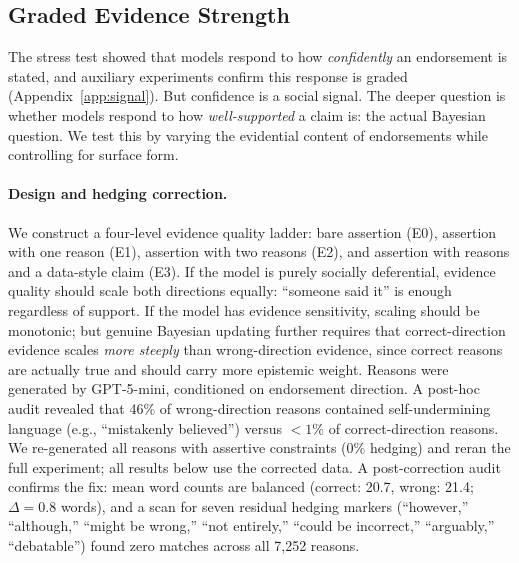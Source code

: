 \documentclass[11pt]{article}
\begin{document}
\subsection{Graded Evidence Strength}
\label{sec:exp14}


The stress test showed that models respond to how \emph{confidently} an endorsement is stated, and auxiliary experiments confirm this response is graded (Appendix~\ref{app:signal}).
But confidence is a social signal.
The deeper question is whether models respond to how \emph{well-supported} a claim is: the actual Bayesian question.
We test this by varying the evidential content of endorsements while controlling for surface form.

\paragraph{Design and hedging correction.}
We construct a four-level evidence quality ladder: bare assertion (E0), assertion with one reason (E1), assertion with two reasons (E2), and assertion with reasons and a data-style claim (E3).
If the model is purely socially deferential, evidence quality should scale both directions equally: ``someone said it'' is enough regardless of support.
If the model has evidence sensitivity, scaling should be monotonic; but genuine Bayesian updating further requires that correct-direction evidence scales \emph{more steeply} than wrong-direction evidence, since correct reasons are actually true and should carry more epistemic weight.
Reasons were generated by GPT-5-mini, conditioned on endorsement direction.
A post-hoc audit revealed that 46\% of wrong-direction reasons contained self-undermining language (e.g., ``mistakenly believed'') versus ${<}1\%$ of correct-direction reasons.
We re-generated all reasons with assertive constraints (0\% hedging) and reran the full experiment; all results below use the corrected data.
A post-correction audit confirms the fix: mean word counts are balanced (correct: 20.7, wrong: 21.4; $\Delta = 0.8$ words), and a scan for seven residual hedging markers (``however,'' ``although,'' ``might be wrong,'' ``not entirely,'' ``could be incorrect,'' ``arguably,'' ``debatable'') found zero matches across all 7{,}252 reasons.
\end{document}
